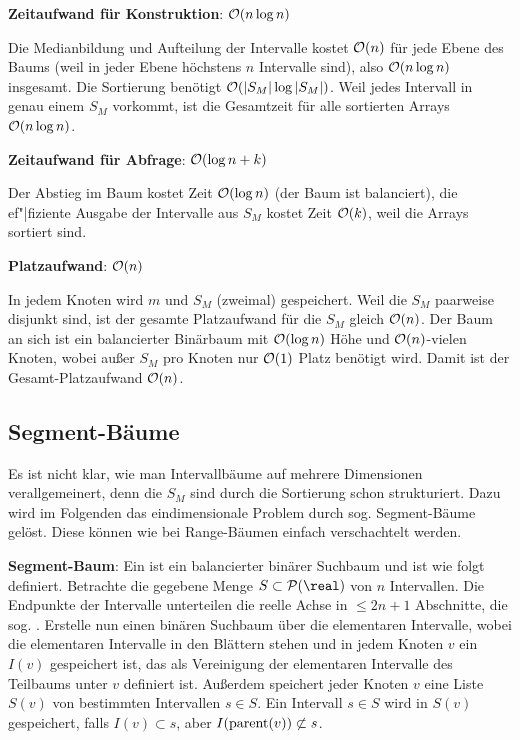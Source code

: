 \linie

\textbf{Zeitaufwand für Konstruktion}:
$\mathcal{O}(n \log n)$

\begin{Beweis}
    Die Medianbildung und Aufteilung der Intervalle kostet $\mathcal{O}(n)$ für jede Ebene des Baums
    (weil in jeder Ebene höchstens $n$ Intervalle sind), also $\mathcal{O}(n \log n)$ insgesamt.
    Die Sortierung benötigt $\mathcal{O}(|S_M| \log |S_M|)$.
    Weil jedes Intervall in genau einem $S_M$ vorkommt, ist die Gesamtzeit für alle sortierten
    Arrays $\mathcal{O}(n \log n)$.
\end{Beweis}

\textbf{Zeitaufwand für Abfrage}:
$\mathcal{O}(\log n + k)$

\begin{Beweis}
    Der Abstieg im Baum kostet Zeit $\mathcal{O}(\log n)$
    (der Baum ist balanciert),
    die ef"|fiziente Ausgabe der Intervalle aus
    $S_M$ kostet Zeit $\mathcal{O}(k)$, weil die Arrays sortiert sind.
\end{Beweis}

\textbf{Platzaufwand}:
$\mathcal{O}(n)$

\begin{Beweis}
    In jedem Knoten wird $m$ und $S_M$ (zweimal) gespeichert.
    Weil die $S_M$ paarweise disjunkt sind, ist der gesamte Platzaufwand für die $S_M$
    gleich $\mathcal{O}(n)$.
    Der Baum an sich ist ein balancierter Binärbaum mit $\mathcal{O}(\log n)$ Höhe und
    $\mathcal{O}(n)$-vielen Knoten, wobei außer $S_M$ pro Knoten nur $\mathcal{O}(1)$ Platz benötigt wird.
    Damit ist der Gesamt-Platzaufwand $\mathcal{O}(n)$.
\end{Beweis}

\pagebreak

\subsection{%
    Segment-Bäume%
}

Es ist nicht klar, wie man Intervallbäume auf mehrere Dimensionen verallgemeinert,
denn die $S_M$ sind durch die Sortierung schon strukturiert.
Dazu wird im Folgenden das eindimensionale Problem durch sog. Segment-Bäume gelöst.
Diese können wie bei Range-Bäumen einfach verschachtelt werden.

\textbf{Segment-Baum}:
Ein  ist ein balancierter binärer Suchbaum und ist wie folgt definiert.
Betrachte die gegebene Menge $S \subset \P(\real)$ von $n$ Intervallen.
Die Endpunkte der Intervalle unterteilen die reelle Achse in $\le 2n + 1$ Abschnitte,
die sog. .
Erstelle nun einen binären Suchbaum über die elementaren Intervalle,
wobei die elementaren Intervalle in den Blättern stehen und in jedem Knoten $v$
ein  $I(v)$ gespeichert ist,
das als Vereinigung der elementaren Intervalle des Teilbaums unter $v$ definiert ist.
Außerdem speichert jeder Knoten $v$ eine Liste $S(v)$ von bestimmten Intervallen $s \in S$.
Ein Intervall $s \in S$ wird in $S(v)$ gespeichert, falls
$I(v) \subset s$, aber $I(\operatorname{parent}(v)) \not\subset s$.

